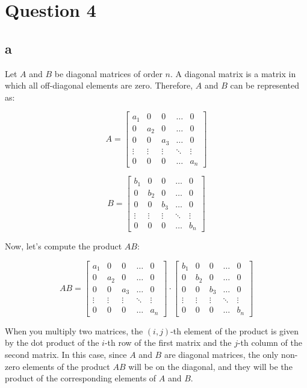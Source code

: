 \section{Question 4}
\subsection{a}
Let $A$ and $B$ be diagonal matrices of order $n$. A diagonal matrix is a matrix in which all off-diagonal elements are zero. Therefore, $A$ and $B$ can be represented as:

\[
A = \begin{bmatrix}
a_1 & 0 & 0 & \ldots & 0 \\
0 & a_2 & 0 & \ldots & 0 \\
0 & 0 & a_3 & \ldots & 0 \\
\vdots & \vdots & \vdots & \ddots & \vdots \\
0 & 0 & 0 & \ldots & a_n
\end{bmatrix}
\]

\[
B = \begin{bmatrix}
b_1 & 0 & 0 & \ldots & 0 \\
0 & b_2 & 0 & \ldots & 0 \\
0 & 0 & b_3 & \ldots & 0 \\
\vdots & \vdots & \vdots & \ddots & \vdots \\
0 & 0 & 0 & \ldots & b_n
\end{bmatrix}
\]

Now, let's compute the product $AB$:

\[
AB = \begin{bmatrix}
a_1 & 0 & 0 & \ldots & 0 \\
0 & a_2 & 0 & \ldots & 0 \\
0 & 0 & a_3 & \ldots & 0 \\
\vdots & \vdots & \vdots & \ddots & \vdots \\
0 & 0 & 0 & \ldots & a_n
\end{bmatrix} \cdot
\begin{bmatrix}
b_1 & 0 & 0 & \ldots & 0 \\
0 & b_2 & 0 & \ldots & 0 \\
0 & 0 & b_3 & \ldots & 0 \\
\vdots & \vdots & \vdots & \ddots & \vdots \\
0 & 0 & 0 & \ldots & b_n
\end{bmatrix}
\]

When you multiply two matrices, the $(i, j)$-th element of the product is given by the dot product of the $i$-th row of the first matrix and the $j$-th column of the second matrix. In this case, since $A$ and $B$ are diagonal matrices, the only non-zero elements of the product $AB$ will be on the diagonal, and they will be the product of the corresponding elements of $A$ and $B$.

